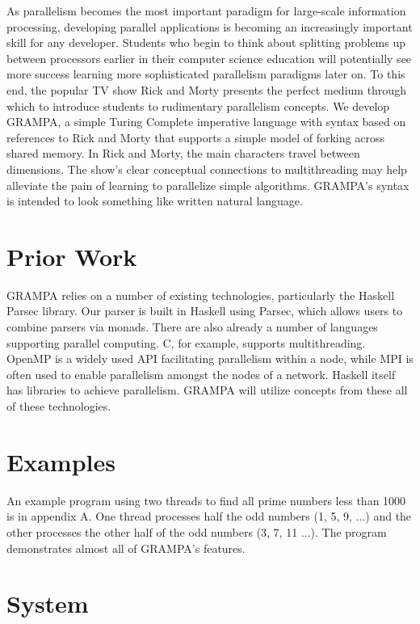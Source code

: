 \documentclass[numbers]{sigplanconf}
\begin{document}
As parallelism becomes the most important paradigm for large-scale information processing, developing parallel applications is becoming an increasingly important skill for any developer. Students who begin to think about splitting problems up between processors earlier in their computer science education will potentially see more success learning more sophisticated parallelism paradigms later on. To this end, the popular TV show Rick and Morty presents the perfect medium through which to introduce students to rudimentary parallelism concepts. We develop GRAMPA, a simple Turing Complete imperative language with syntax based on references to Rick and Morty that supports a simple model of forking across shared memory. In Rick and Morty, the main characters travel between dimensions. The show's clear conceptual connections to multithreading may help alleviate the pain of learning to parallelize simple algorithms. GRAMPA's syntax is intended to look something like written natural language.

\section{Prior Work}

GRAMPA relies on a number of existing technologies, particularly the Haskell Parsec library. Our parser is built in Haskell using Parsec, which allows users to combine parsers via monads. There are also already a number of languages supporting parallel computing. C, for example, supports multithreading. OpenMP is a widely used API facilitating parallelism within a node, while MPI is often used to enable parallelism amongst the nodes of a network. Haskell itself has libraries to achieve parallelism. GRAMPA will utilize concepts from these all of these technologies.

\section{Examples}
An example program using two threads to find all prime numbers less than 1000 is in appendix A. One thread processes half the odd numbers (1, 5, 9, $\ldots$) and the other processes the other half of the odd numbers (3, 7, 11 $\ldots$). The program demonstrates almost all of GRAMPA's features.

\section{System}
\end{document}

